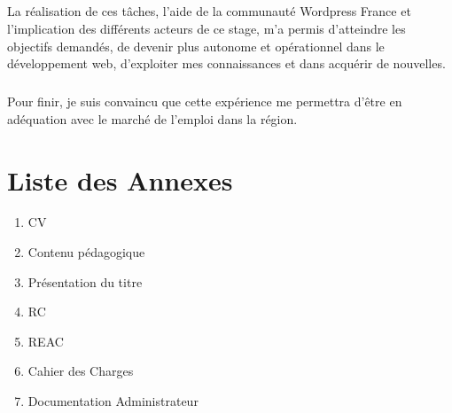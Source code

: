 \documentclass[11pt,a4paper]{report}
\begin{document}
	\paragraph*{}La réalisation de ces tâches, l'aide de la communauté Wordpress France et l'implication des différents acteurs de ce stage, m'a permis d'atteindre les objectifs demandés, de devenir plus autonome et opérationnel dans le développement web, d'exploiter mes connaissances et dans acquérir de nouvelles.
	\paragraph*{}Pour finir, je suis convaincu que cette expérience me permettra d'être en adéquation avec le marché de l'emploi dans la région.
	


\chapter{Liste des Annexes}
	\begin{enumerate}
		\item CV
		\item Contenu pédagogique
		\item Présentation du titre
		\item RC
		\item REAC
		\item Cahier des Charges
		\item Documentation Administrateur
	\end{enumerate}


\listoffigures {}
\listoftables
\end{document}
